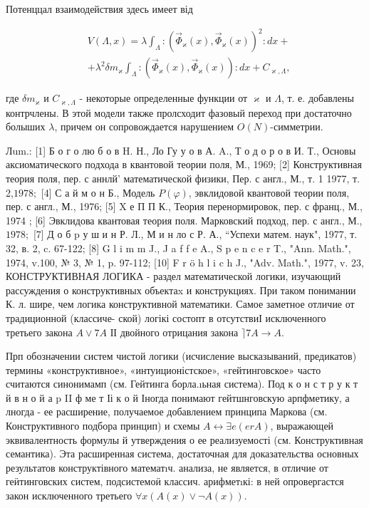 \documentclass[10pt]{article}
\begin{document}
Потенццал взаимодействия здесь имеет від



\[

\begin{aligned}

& V(\Lambda, x)=\lambda \int_{\Lambda}:\left(\vec{\Phi}_{\varkappa}(x), \vec{\Phi}_{\varkappa}(x)\right)^{2}: d x+ \\

&+\lambda^{2} \delta m_{\varkappa} \int_{\Lambda}:\left(\vec{\Phi}_{\varkappa}(x), \vec{\Phi}_{\varkappa}(x)\right): d x+C_{\varkappa, \Lambda},

\end{aligned}

\]



где $\delta m_{\varkappa}$ и $C_{\varkappa, \Lambda}$ - некоторые определенные функции от $\varkappa$ и $\Lambda$, т. е. добавлены контрчлены. В этой модели также пролсходит фазовый переход при достаточно болыших $\lambda$, причем он сопровождается нарушением $O(N)$-симметрии.



Лum.: [1] Б о г о лю б о в H. Н., Ло Гу у о в А. A., Т о д о р о в И. Т., Основы аксиоматического подхода в квантовой теории поля, М., 1969; [2] Конструктивная теория поля, пер. с аннлй' математической физики, Пер. с англ., М., т. 1 1977, т. 2,$1978 ;$ [4] С а й м о н Б., Модель $P(\varphi)$, эвклидовой квантовой теории поля, пер. с англ., М., 1976; [5] X е П П К., Теория перенормировок, пер. с франц., М., 1974 ; [6] Эвклидова квантовая теория поля. Марковский подход, пер. с англ., М., $1978 ;$ [7] Д о б $\mathrm{p}$ у ш и н Р. Л., М и н ло с Р. А., “Успехи матем. наук", 1977, т. 32, в. 2, c. 67-122; [8] G l i m m J., J a f f e A., S p e n c e r T., "Ann. Math.", 1974, v.100, № 3, № 1, p. 97-112; [10] F r ö h l i c h J., "Adv. Math.", 1977, v. 23, КОНСТРУКТИВНАЯ ЛОГИКА - раздел математической логики, изучающий рассуждения о конструктивных объектаx и конструкциях. При таком понимании К. л. шире, чем логика конструктивной математики. Самое заметное отличие от традиционной (классиче- ской) логікі состопт в отсутствиІ исключенного третьего закона $A \vee 7 A$ ІІ двойного отрицания закона $\rceil 7 A \rightarrow A$.



Прп обозначении систем чистой логики (исчисление высказываний, предикатов) термины «конструктивное», «интуиционістское», «гейтинговское» часто считаются синонимамп (см. Гейтинга борла.ıьная система). Под к о н с т р у к т й в н о й а p II ф ме т Іі к о й Іногда понимают гейтшнговскую арпфметику, а лногда - ее расширение, получаемое добавлением принципа Маркова (см. Конструктивного подбора принцип) и схемы $A \leftrightarrow \exists e(e r A)$, выражающей эквивалентность формулы й утверждения о ее реализуемості (см. Конструктивная семантика). Эта расширенная система, достаточная для доказательства основных результатов конструктівного математıч. анализа, не является, в отличие от геӥтинговских систем, подсистемоӥ классич. арифметıкі: в ней опровергастся закон исключенного третьего $\forall x(A(x) \vee \neg A(x))$.
\end{document}
